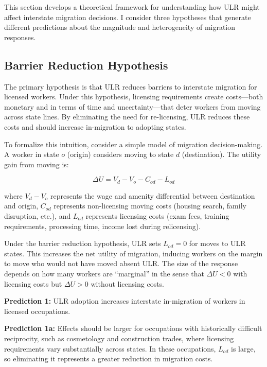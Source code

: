 \documentclass[12pt]{article}
\begin{document}
This section develops a theoretical framework for understanding how ULR might affect interstate migration decisions. I consider three hypotheses that generate different predictions about the magnitude and heterogeneity of migration responses.

\subsection{Barrier Reduction Hypothesis}

The primary hypothesis is that ULR reduces barriers to interstate migration for licensed workers. Under this hypothesis, licensing requirements create costs---both monetary and in terms of time and uncertainty---that deter workers from moving across state lines. By eliminating the need for re-licensing, ULR reduces these costs and should increase in-migration to adopting states.

To formalize this intuition, consider a simple model of migration decision-making. A worker in state $o$ (origin) considers moving to state $d$ (destination). The utility gain from moving is:

\begin{equation}
\Delta U = V_d - V_o - C_{od} - L_{od}
\end{equation}

where $V_d - V_o$ represents the wage and amenity differential between destination and origin, $C_{od}$ represents non-licensing moving costs (housing search, family disruption, etc.), and $L_{od}$ represents licensing costs (exam fees, training requirements, processing time, income lost during relicensing).

Under the barrier reduction hypothesis, ULR sets $L_{od} = 0$ for moves to ULR states. This increases the net utility of migration, inducing workers on the margin to move who would not have moved absent ULR. The size of the response depends on how many workers are ``marginal'' in the sense that $\Delta U < 0$ with licensing costs but $\Delta U > 0$ without licensing costs.

\textbf{Prediction 1:} ULR adoption increases interstate in-migration of workers in licensed occupations.

\textbf{Prediction 1a:} Effects should be larger for occupations with historically difficult reciprocity, such as cosmetology and construction trades, where licensing requirements vary substantially across states. In these occupations, $L_{od}$ is large, so eliminating it represents a greater reduction in migration costs.
\end{document}
